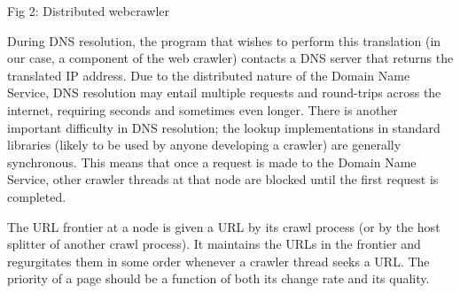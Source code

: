Fig 2: Distributed webcrawler

During DNS resolution, the program that wishes to perform this translation (in our case, a component of the web crawler) contacts a DNS server that returns the translated IP address.
Due to the distributed nature of the Domain Name Service, DNS resolution may entail multiple requests and round-trips across the internet, requiring seconds and sometimes even longer. There is another important difficulty in DNS resolution; the lookup implementations in standard libraries (likely to be used by anyone developing a crawler) are generally synchronous. This means that once a request is made to the Domain Name Service, other crawler threads at that node are blocked until the first request is completed.

The URL frontier at a node is given a URL by its crawl process (or by the host splitter of another crawl process). It maintains the URLs in the frontier and regurgitates them in some order whenever a crawler thread seeks a URL. The priority of a page should be a function of both its change rate and its quality.
